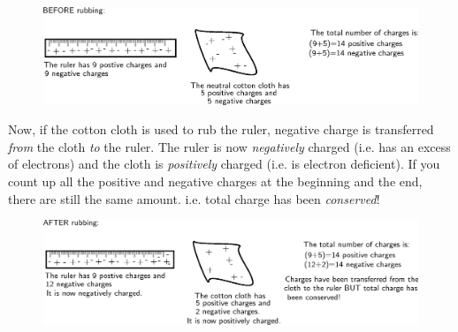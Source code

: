 	\begin{figure}[H] %
    \begin{center}
    \label{m38780*id200777!!!underscore!!!media}\label{m38780*id200777!!!underscore!!!printimage}\includegraphics[width=0.8\columnwidth]{col11305.imgs/m38780_PG10C8_002.png} %
        
      \vspace{2pt}
    \vspace{.1in}
    
    \end{center}

 \end{figure}   

    \addtocounter{footnote}{-0}
    
      \par 
      \label{m38780*id200783}Now, if the cotton cloth is used to rub the ruler, negative charge
is transferred \textsl{from} the cloth \textsl{to} the ruler.
The ruler is now \textsl{negatively} charged (i.e. has an excess of electrons) and the cloth is \textsl{positively} charged (i.e. is electron deficient).
If you count up all the positive and negative charges at the beginning and the end, there are still the same amount. i.e. total charge has been \textsl{conserved}!\par 
      \label{m38780*id200814}
        
    \setcounter{subfigure}{0}


	\begin{figure}[H] %
    \begin{center}
    \label{m38780*id200819!!!underscore!!!media}\label{m38780*id200819!!!underscore!!!printimage}\includegraphics[width=0.8\columnwidth]{col11305.imgs/m38780_PG10C8_003.png} %
        
      \vspace{2pt}
    \vspace{.1in}
    
    \end{center}

 \end{figure}   

